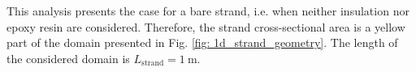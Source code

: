 
This analysis presents the case for a bare strand, i.e. when neither insulation nor epoxy resin are considered. Therefore, the strand cross-sectional area is a yellow part of the domain presented in Fig. \ref{fig: 1d_strand_geometry}. The length of the considered domain is $L_\text{strand}=1~\text{m}$.